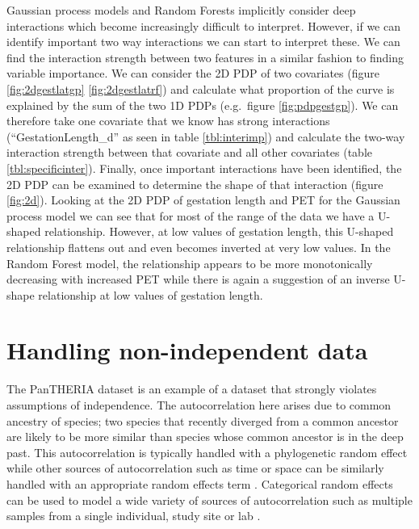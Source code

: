 \documentclass[10pt,]{article}
\begin{document}
Gaussian process models and Random Forests implicitly consider deep interactions which become increasingly difficult to interpret.
However, if we can identify important two way interactions we can start to interpret these.
We can find the interaction strength between two features in a similar fashion to finding variable importance.
We can consider the 2D PDP of two covariates (figure \ref{fig:2dgestlatgp} \ref{fig:2dgestlatrf}) and calculate what proportion of the curve is explained by the sum of the two 1D PDPs (e.g.~figure \ref{fig:pdpgestgp}).
We can therefore take one covariate that we know has strong interactions (``GestationLength\_d'' as seen in table \ref{tbl:interimp}) and calculate the two-way interaction strength between that covariate and all other covariates (table \ref{tbl:specificinter}).
Finally, once important interactions have been identified, the 2D PDP can be examined to determine the shape of that interaction (figure \ref{fig:2d}).
Looking at the 2D PDP of gestation length and PET for the Gaussian process model we can see that for most of the range of the data we have a U-shaped relationship.
However, at low values of gestation length, this U-shaped relationship flattens out and even becomes inverted at very low values.
In the Random Forest model, the relationship appears to be more monotonically decreasing with increased PET while there is again a suggestion of an inverse U-shape relationship at low values of gestation length.



\section{Handling non-independent data}\label{handling-non-independent-data}

The PanTHERIA dataset is an example of a dataset that strongly violates assumptions of independence.
The autocorrelation here arises due to common ancestry of species; two species that recently diverged from a common ancestor are likely to be more similar than species whose common ancestor is in the deep past.
This autocorrelation is typically handled with a phylogenetic random effect \citep{felsenstein1985phylogenies, ives2006statistics, gay2014parasite, pellissier2012shifts, ferguson2014colony} while other sources of autocorrelation such as time or space can be similarly handled with an appropriate random effects term \citep{ives2006statistics, redding2017evaluating, diggle1998model}.
Categorical random effects can be used to model a wide variety of sources of autocorrelation such as multiple samples from a single individual, study site or lab  \citep{harrison2018brief, bolker2009generalized}.
\end{document}
